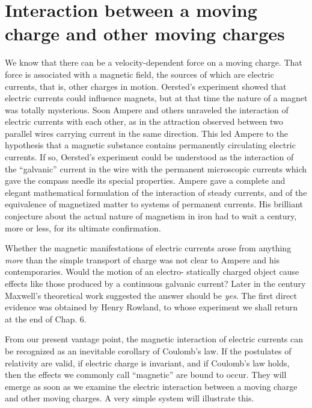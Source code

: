 
\section{Interaction between a moving charge and other moving charges}

We know that there can be a velocity-dependent force on a moving
charge. That force is associated with a magnetic field, the sources of
which are electric currents, that is, other charges in motion.
Oersted's experiment showed that electric currents could influence
magnets, but at that time the nature of a magnet was totally
mysterious. Soon Ampere and others unraveled the interaction of
electric currents with each other, as in the attraction observed between
two parallel wires carrying current in the same direction. This
led Ampere to the hypothesis that a magnetic substance contains
permanently circulating electric currents. If so, Oersted's experiment
could be understood as the interaction of the ``galvanic'' current
in the wire with the permanent microscopic currents which gave
the compass needle its special properties. Ampere gave a complete
and elegant mathematical formulation of the interaction of steady
currents, and of the equivalence of magnetized matter to systems of
permanent currents. His brilliant conjecture about the actual nature
of magnetism in iron had to wait a century, more or less, for its
ultimate confirmation.

Whether the magnetic manifestations of electric currents arose
from anything \emph{more} than the simple transport of charge was not clear
to Ampere and his contemporaries. Would the motion of an electro-
statically charged object cause effects like those produced by a continuous
galvanic current? Later in the century Maxwell's theoretical
work suggested the answer should be \emph{yes}. The first direct evidence
was obtained by Henry Rowland, to whose experiment we shall return
at the end of Chap. 6.

From our present vantage point, the magnetic interaction of
electric currents can be recognized as an inevitable corollary
of Coulomb's law. If the postulates of relativity are valid, if electric
charge is invariant, and if Coulomb's law holds, then the effects we
commonly call ``magnetic'' are bound to occur. They will emerge as
soon as we examine the electric interaction between a moving charge
and other moving charges. A very simple system will illustrate this.

